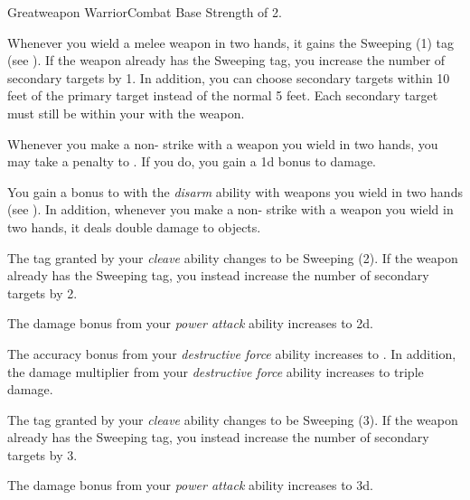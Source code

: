     \begin{feat}{Greatweapon Warrior}{Combat}
        \featpre Base Strength of 2.

         Whenever you wield a melee weapon in two hands, it gains the Sweeping (1) tag (see ).
        If the weapon already has the Sweeping tag, you increase the number of secondary targets by 1.
        In addition, you can choose secondary targets within 10 feet of the primary target instead of the normal 5 feet.
        Each secondary target must still be within your  with the weapon.

         Whenever you make a non- strike with a weapon you wield in two hands, you may take a  penalty to .
        If you do, you gain a \plus1d bonus to damage.

         You gain a  bonus to  with the \textit{disarm} ability with weapons you wield in two hands (see ).
        In addition, whenever you make a non- strike with a weapon you wield in two hands, it deals double damage to objects.

         The tag granted by your \textit{cleave} ability changes to be Sweeping (2).
        If the weapon already has the Sweeping tag, you instead increase the number of secondary targets by 2.

         The damage bonus from your \textit{power attack} ability increases to \plus2d.

         The accuracy bonus from your \textit{destructive force} ability increases to .
        In addition, the damage multiplier from your \textit{destructive force} ability increases to triple damage.

         The tag granted by your \textit{cleave} ability changes to be Sweeping (3).
        If the weapon already has the Sweeping tag, you instead increase the number of secondary targets by 3.

         The damage bonus from your \textit{power attack} ability increases to \plus3d.
    \end{feat}

